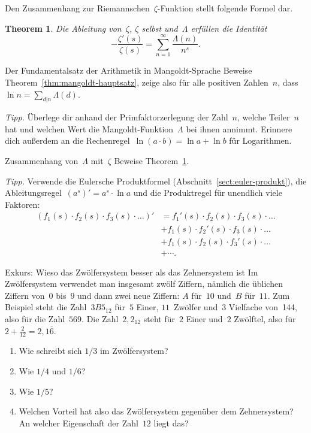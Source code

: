 \documentclass[twoside]{../zirkelblatt1415}
\theoremstyle{definition}
\theoremstyle{plain}
\newtheorem{thm}[defn]{Theorem}
\theoremstyle{remark}
\begin{document}
Den Zusammenhang zur Riemannschen~$\zeta$-Funktion stellt folgende Formel dar.

\begin{thm}\label{thm:mangoldt-zeta}
Die Ableitung von~$\zeta$, $\zeta$ selbst und~$\Lambda$ erfüllen
die Identität
\[ -\frac{\zeta'(s)}{\zeta(s)} = \sum_{n=1}^\infty \frac{\Lambda(n)}{n^s}. \]
\end{thm}

\begin{aufgabe}{Der Fundamentalsatz der Arithmetik in Mangoldt-Sprache}
Beweise Theorem~\ref{thm:mangoldt-hauptsatz}, zeige also für alle positiven
Zahlen~$n$, dass~$\ln n = \sum_{d|n} \Lambda(d)$.

\emph{Tipp.} Überlege dir anhand der Primfaktorzerlegung der Zahl~$n$, welche
Teiler~$n$ hat und welchen Wert die Mangoldt-Funktion~$\Lambda$ bei ihnen
annimmt. Erinnere dich außerdem an die Rechenregel~$\ln(a \cdot b) = \ln a +
\ln b$ für Logarithmen.
\end{aufgabe}

\begin{aufgabe}{Zusammenhang von~$\Lambda$ mit~$\zeta$}
Beweise Theorem~\ref{thm:mangoldt-zeta}.

\emph{Tipp.} Verwende die Eulersche Produktformel
(Abschnitt~\ref{sect:euler-produkt}), die Ableitungsregel~$(a^s)' = a^s \cdot
\ln a$ und die Produktregel für unendlich viele Faktoren:
\begin{align*}
  (f_1(s) \cdot f_2(s) \cdot f_3(s) \cdot \ldots)' &=
  f_1'(s) \cdot f_2(s) \cdot f_3(s) \cdot \ldots \\
  &\mathrel{+} f_1(s) \cdot f_2'(s) \cdot f_3(s) \cdot \ldots \\
  &\mathrel{+} f_1(s) \cdot f_2(s) \cdot f_3'(s) \cdot \ldots \\
  &\mathrel{+} \cdots.
\end{align*}
\vspace{-2em}
\end{aufgabe}

\begin{aufgabe}{Exkurs: Wieso das Zwölfersystem besser als das Zehnersystem ist}
Im Zwölfersystem verwendet man insgesamt zwölf Ziffern, nämlich die üblichen
Ziffern von~$0$ bis~$9$ und dann zwei neue Ziffern: $A$ für~$10$ und~$B$
für~$11$. Zum Beispiel steht die Zahl~$3B5_{12}$ für~$5$ Einer, $11$~Zwölfer
und~$3$ Vielfache von~144, also für die Zahl~$569$. Die Zahl~$2{,}2_{12}$ steht
für~$2$ Einer und~$2$ Zwölftel, also für~$2 + \frac{2}{12} =
2{,}1\overline{6}$.
\begin{enumerate}
\item Wie schreibt sich $1/3$ im Zwölfersystem?
\item Wie $1/4$ und $1/6$?
\item Wie $1/5$?
\item Welchen Vorteil hat also das Zwölfersystem gegenüber dem Zehnersystem? An
welcher Eigenschaft der Zahl~$12$ liegt das?
\end{enumerate}\fixlistspacing
\end{aufgabe}
\end{document}
